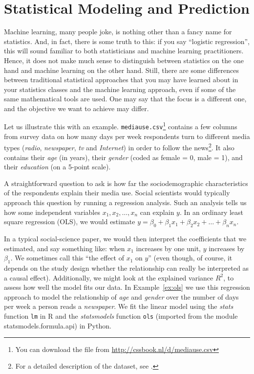 \section{Statistical Modeling and Prediction}
\label{sec:prediction}
Machine learning, many people joke, is nothing other than a fancy name
for statistics.  And, in fact, there is some truth to this: if you say
``logistic regression'', this will sound familiar to both
statisticians and machine learning practitioners.  Hence, it does not
make much sense to distinguish between statistics on the one hand and
machine learning on the other hand.
Still, there are some differences between traditional statistical
approaches that you may have learned about in your statistics classes
and the machine learning approach, even if
some of the same
mathematical tools are used. One may say that  the focus is a different
one, and the objective we want to achieve may differ.

Let us illustrate this with an example.
\texttt{mediause.csv}\footnote{You can download the file from
  \url{http://cssbook.nl/d/mediause.csv}} contains a few columns from
survey data on how many days per week respondents turn to different
media types (\emph{radio}, \emph{newspaper}, \emph{tv} and \emph{Internet}) in order to follow the news\footnote{For a detailed
  description of the dataset, see \citet{Trilling2013phd}.}. It also
contains their \emph{age} (in years), their \emph{gender} (coded as female = 0, male = 1), and their \emph{education} (on a 5-point scale).

A straightforward question to ask is how far the
sociodemographic characteristics of the respondents explain their
media use.  Social scientists would typically approach this question
by running a regression analysis.  Such an analysis tells us how some
independent variables $x_1, x_2, \ldots, x_n$ can explain $y$.  In an
ordinary least square regression (OLS), we would estimate $y=\beta_0 +
\beta_1 x_1 + \beta_2 x_2 + \ldots + \beta_n x_n$.

In a typical social-science paper, we would then interpret the coefficients
that we estimated, and say something like: when $x_1$ increases by one unit,
$y$ increases by $\beta_1$.
We sometimes call this ``the effect of $x_1$ on $y$'' (even though, of course,
it depends on the study design whether the relationship can really be interpreted
as a causal effect).
Additionally, we might look at the explained variance $R^2$, to assess how well the model fits our data. In Example~\ref{ex:ols} we use this regression approach to model the relationship of \emph{age} and \emph{gender} over the number of days per week a person reads a \emph{newspaper}. We fit the linear model using the \emph{stats} function \texttt{lm} in R and the \emph{statsmodels} function \texttt{ols} (imported from the module statsmodels.formula.api) in Python.

